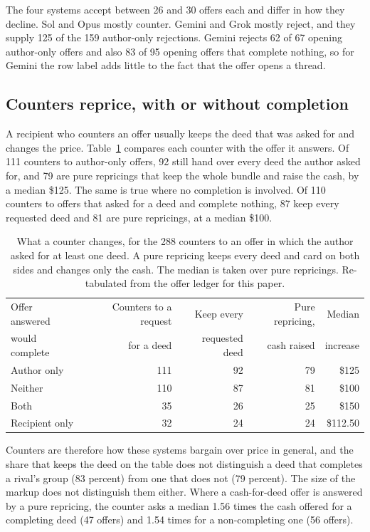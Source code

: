 The four systems accept between 26 and 30 offers each and differ in how they decline. Sol and Opus mostly counter. Gemini and Grok mostly reject, and they supply 125 of the 159 author-only rejections. Gemini rejects 62 of 67 opening author-only offers and also 83 of 95 opening offers that complete nothing, so for Gemini the row label adds little to the fact that the offer opens a thread.

\subsection{Counters reprice, with or without completion}
\label{sec:counters}

A recipient who counters an offer usually keeps the deed that was asked for and changes the price. Table~\ref{tab:counters} compares each counter with the offer it answers. Of 111 counters to author-only offers, 92 still hand over every deed the author asked for, and 79 are pure repricings that keep the whole bundle and raise the cash, by a median \$125. The same is true where no completion is involved. Of 110 counters to offers that asked for a deed and complete nothing, 87 keep every requested deed and 81 are pure repricings, at a median \$100.

\begin{table}[t]
\centering\small
\begin{tabular}{@{}lrrrr@{}}
\toprule
Offer answered & Counters to a request & Keep every & Pure repricing, & Median\\
would complete & for a deed & requested deed & cash raised & increase\\
\midrule
Author only & 111 & 92 & 79 & \$125\\
Neither & 110 & 87 & 81 & \$100\\
Both & 35 & 26 & 25 & \$150\\
Recipient only & 32 & 24 & 24 & \$112.50\\
\bottomrule
\end{tabular}
\caption{What a counter changes, for the 288 counters to an offer in which the author asked for at least one deed. A pure repricing keeps every deed and card on both sides and changes only the cash. The median is taken over pure repricings. Re-tabulated from the offer ledger for this paper.}
\label{tab:counters}
\end{table}

Counters are therefore how these systems bargain over price in general, and the share that keeps the deed on the table does not distinguish a deed that completes a rival's group (83 percent) from one that does not (79 percent). The size of the markup does not distinguish them either. Where a cash-for-deed offer is answered by a pure repricing, the counter asks a median 1.56 times the cash offered for a completing deed (47 offers) and 1.54 times for a non-completing one (56 offers).

